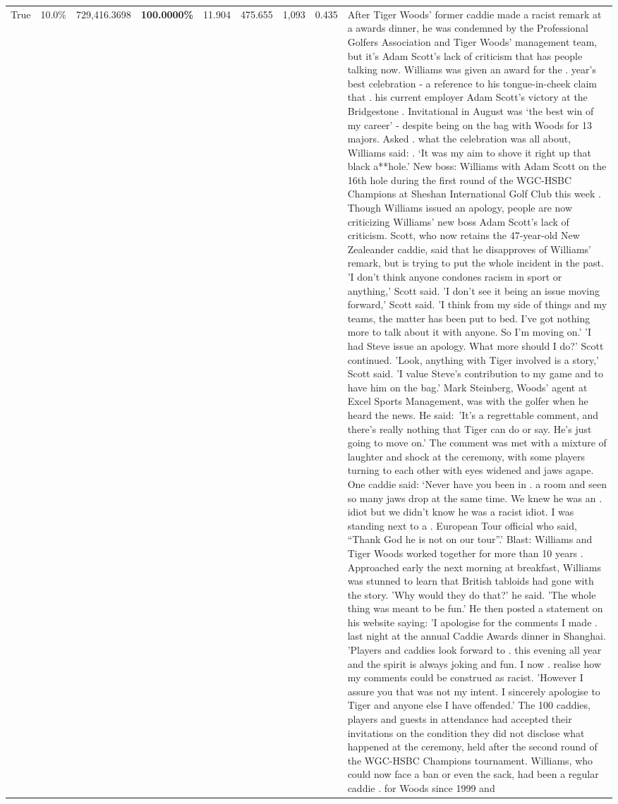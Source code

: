 \begin{table}[H]
\begin{tabular}{lllrlllll}
True & 10.0\% & 729,416.3698 & \bfseries \color{red} 100.0000\% & 11.904 & 475.655 & 1,093 & 0.435 & After Tiger Woods' former caddie made a racist remark at a awards dinner, he was condemned by the Professional Golfers Association and Tiger Woods' management team, but it's Adam Scott's lack of criticism that has people talking now. Williams was given an award for the . year’s best celebration - a reference to his tongue-in-cheek claim that . his current employer Adam Scott’s victory at the Bridgestone . Invitational in August was ‘the best win of my career’ - despite being on the bag with Woods for 13 majors. Asked . what the celebration was all about, Williams said: . ‘It was my aim to shove it right up that black a**hole.’ New boss: Williams with Adam Scott  on the 16th hole during the first round of the WGC-HSBC Champions at Sheshan International Golf Club this week . Though Williams issued an apology, people are now criticizing Williams' new boss Adam Scott's lack of criticism. Scott, who now retains the 47-year-old New Zealeander caddie, said that he disapproves of Williams' remark, but is trying to put the whole incident in the past. 'I don't think anyone condones racism in sport or anything,' Scott said. 'I don't see it being an issue moving forward,' Scott said. 'I think from my side of things and my teams, the matter has been put to bed. I've got nothing more to talk about it with anyone. So I'm moving on.' 'I had Steve issue an apology. What more should I do?' Scott continued. 'Look, anything with Tiger involved is a story,' Scott said. 'I value Steve's contribution to my game and to have him on the bag.' Mark Steinberg, Woods' agent at Excel Sports Management, was with the golfer when he heard the news. He said: 'It's a regrettable comment, and there's really nothing that Tiger can do or say. He's just going to move on.' The comment was met with a mixture of laughter and shock at the ceremony, with some players turning to each other with eyes widened and jaws agape. One caddie said: ‘Never have you been in . a room and seen so many jaws drop at the same time. We knew he was an . idiot but we didn’t know he was a racist idiot. I was standing next to a . European Tour official who said, “Thank God he is not on our tour”.’ Blast: Williams and Tiger Woods worked together for more than 10 years . Approached early the next morning at breakfast, Williams was stunned to learn that British tabloids had gone with the story. 'Why would they do that?' he said. 'The whole thing was meant to be fun.' He then posted a statement on his website saying: 'I apologise for the comments I made . last night at the annual Caddie Awards dinner in Shanghai. 'Players and caddies look forward to . this evening all year and the spirit is always joking and fun. I now . realise how my comments could be construed as racist. 'However I assure you that was not my intent. I sincerely apologise to Tiger and anyone else I have offended.' The 100 caddies, players and guests in attendance had accepted their invitations on the condition they did not disclose what happened at the ceremony, held after the second round of the WGC-HSBC Champions tournament. Williams, who could now face a ban or even the sack, had been a regular caddie . for Woods since 1999 and 
\end{tabular}
\end{table}
